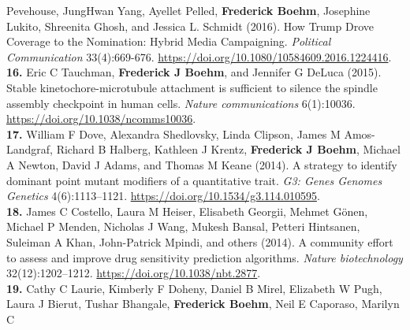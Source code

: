 \documentclass[
  10pt,
]
{article}
\begin{document}
Pevehouse\normalsize , \normalsize JungHwan Yang\normalsize ,
\normalsize Ayellet Pelled\normalsize ,
\textbf{\normalsize Frederick Boehm}\normalsize , \normalsize Josephine
Lukito\normalsize , \normalsize Shreenita Ghosh\normalsize , and
\normalsize Jessica L. Schmidt (2016). How Trump Drove Coverage to the
Nomination: Hybrid Media Campaigning. \emph{Political Communication}
33(4):669-676. \url{https://doi.org/10.1080/10584609.2016.1224416}.\\
\textbf{16.} \normalsize \normalsize Eric C Tauchman\normalsize ,
\textbf{\normalsize Frederick J Boehm}\normalsize , and
\normalsize Jennifer G DeLuca (2015). Stable kinetochore-microtubule
attachment is sufficient to silence the spindle assembly checkpoint in
human cells. \emph{Nature communications} 6(1):10036.
\url{https://doi.org/10.1038/ncomms10036}.\\
\textbf{17.} \normalsize \normalsize William F Dove\normalsize ,
\normalsize Alexandra Shedlovsky\normalsize , \normalsize Linda
Clipson\normalsize , \normalsize James M Amos-Landgraf\normalsize ,
\normalsize Richard B Halberg\normalsize , \normalsize Kathleen J
Krentz\normalsize , \textbf{\normalsize Frederick J Boehm}\normalsize ,
\normalsize Michael A Newton\normalsize , \normalsize David J
Adams\normalsize , and \normalsize Thomas M Keane (2014). A strategy to
identify dominant point mutant modifiers of a quantitative trait.
\emph{G3: Genes\textbar{} Genomes\textbar{} Genetics} 4(6):1113--1121.
\url{https://doi.org/10.1534/g3.114.010595}.\\
\textbf{18.} \normalsize \normalsize James C Costello\normalsize ,
\normalsize Laura M Heiser\normalsize , \normalsize Elisabeth
Georgii\normalsize , \normalsize Mehmet Gönen\normalsize ,
\normalsize Michael P Menden\normalsize , \normalsize Nicholas J
Wang\normalsize , \normalsize Mukesh Bansal\normalsize ,
\normalsize Petteri Hintsanen\normalsize , \normalsize Suleiman A
Khan\normalsize , \normalsize John-Patrick Mpindi\normalsize , and
others (2014). A community effort to assess and improve drug sensitivity
prediction algorithms. \emph{Nature biotechnology} 32(12):1202--1212.
\url{https://doi.org/10.1038/nbt.2877}.\\
\textbf{19.} \normalsize \normalsize Cathy C Laurie\normalsize ,
\normalsize Kimberly F Doheny\normalsize , \normalsize Daniel B
Mirel\normalsize , \normalsize Elizabeth W Pugh\normalsize ,
\normalsize Laura J Bierut\normalsize , \normalsize Tushar
Bhangale\normalsize , \textbf{\normalsize Frederick Boehm}\normalsize ,
\normalsize Neil E Caporaso\normalsize , \normalsize Marilyn C
\end{document}
